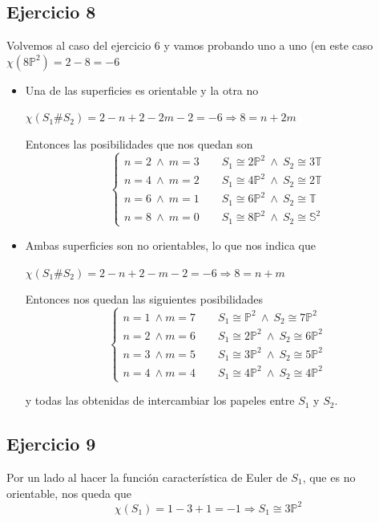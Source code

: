 \documentclass{article}
\begin{document}
\subsection{Ejercicio 8}
Volvemos al caso del ejercicio 6 y vamos probando uno a uno (en este caso $\chi(8\mathbb{P}^2)=2-8=-6$
\begin{itemize}
\item Una de las superficies es orientable y la otra no

$\chi(S_1\#S_2)=2-n+2-2m-2=-6\Rightarrow 8=n+2m$

Entonces las posibilidades que nos quedan son
\begin{equation*}
\left\lbrace\begin{array}{c}
n=2\:\wedge\:m=3\qquad S_1\cong 2\mathbb{P}^2\:\wedge\:S_2\cong 3\mathbb{T}\\
n=4\:\wedge\:m=2\qquad S_1\cong 4\mathbb{P}^2\:\wedge\:S_2\cong 2\mathbb{T}\\
n=6\:\wedge\:m=1\qquad S_1\cong 6\mathbb{P}^2\:\wedge\:S_2\cong \mathbb{T}\\
n=8\:\wedge\:m=0\qquad S_1\cong 8\mathbb{P}^2\:\wedge\:S_2\cong \mathbb{S}^2
\end{array}\right.
\end{equation*}

\item Ambas superficies son no orientables, lo que nos indica que

$\chi(S_1\#S_2)=2-n+2-m-2=-6\Rightarrow 8=n+m$

Entonces nos quedan las siguientes posibilidades
\begin{equation*}
\left\lbrace\begin{array}{c}
n=1\:\wedge m=7\qquad S_1\cong \mathbb{P}^2\:\wedge\:S_2\cong 7\mathbb{P}^2\\
n=2\:\wedge m=6\qquad S_1\cong 2\mathbb{P}^2\:\wedge\:S_2\cong 6\mathbb{P}^2\\
n=3\:\wedge m=5\qquad S_1\cong 3\mathbb{P}^2\:\wedge\:S_2\cong 5\mathbb{P}^2\\
n=4\:\wedge m=4\qquad S_1\cong 4\mathbb{P}^2\:\wedge\:S_2\cong 4\mathbb{P}^2
\end{array}\right.
\end{equation*}

y todas las obtenidas de intercambiar los papeles entre $S_1$ y $S_2$.
\end{itemize}

\subsection{Ejercicio 9}
Por un lado al hacer la función característica de Euler de $S_1$, que es no orientable, nos queda que
\begin{equation*}
\chi(S_1)=1-3+1=-1\Rightarrow S_1\cong 3\mathbb{P}^2
\end{equation*}
\end{document}
